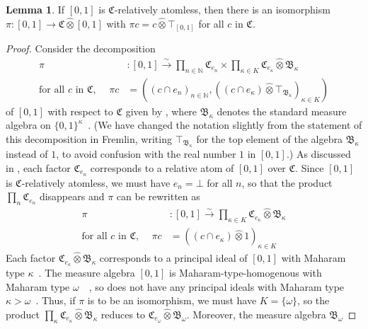 \documentclass[
  sigconf,
  screen, ]{acmart}
\theoremstyle{definition}
\newtheorem{lemma}[theorem]{Lemma}
\newcommand\N{\mathbb N}
\newcommand\frakB{\mathfrak B}
\newcommand\frakC{\mathfrak C}
\newcommand\fremlin[1]{\citet[#1]{fremlin2000measure}}
\newcommand\fremlinft[3]{\citet[\href{https://www1.essex.ac.uk/maths/people/fremlin/chap#2.pdf\#page=#3}{#1}]{fremlin2000measure}}
\newcommand\fremlinf[3]{\cite[\href{https://www1.essex.ac.uk/maths/people/fremlin/chap#2.pdf\#page=#3}{#1}]{fremlin2000measure}}
\newcommand\lmafp{\mathbin{\hat\otimes}}
\begin{document}
\begin{lemma} \label{app:lem:rel-atomless-projection}
  If $[0,1]$ is $\frakC$-relatively atomless,
  then there is an isomorphism $\pi : [0,1]\to \frakC\lmafp[0,1]$
  with $\pi c = c\lmafp \top_{[0,1]}$
  for all $c$ in $\frakC$.
\end{lemma}
\begin{proof}
  Consider the decomposition
   \begin{align*}
      \pi &: [0,1] \xrightarrow{\sim}\prod_{n\in\N} \frakC_{e_n} \times \prod_{\kappa\in K}\frakC_{e_\kappa}\lmafp \frakB_\kappa \\
      \text{for all $c$ in $\frakC$, }\quad\pi c &= ((c \cap e_n)_{n\in \N}, ((c\cap e_\kappa)\lmafp \top_{\frakB_\kappa})_{\kappa\in K})
   \end{align*}
   of $[0,1]$ with respect to $\frakC$
   given by
   \fremlin{\href{https://www1.essex.ac.uk/maths/people/fremlin/chap33.pdf\#page=29}{333K}},
  where $\frakB_\kappa$ denotes the standard
  measure algebra on $\{0,1\}^\kappa$~\fremlinf{333A(d)}{33}{22}.
  (We have changed the notation slightly
  from the statement of this decomposition in Fremlin, writing $\top_{\frakB_\kappa}$
  for the top element of the algebra $\frakB_\kappa$ instead of $1$,
  to avoid confusion with the real number $1$ in $[0,1]$.)
  As discussed in \fremlinft{333K(a)}{33}{29},
  each factor $\frakC_{e_n}$ corresponds to a relative atom of $[0,1]$ over $\frakC$.
  Since $[0,1]$ is $\frakC$-relatively atomless,
  we must have $e_n = \bot$ for all $n$,
  so that the product $\prod_n \frakC_{e_n}$ disappears and $\pi$ can be rewritten as
   \begin{align*}
      \pi &: [0,1] \xrightarrow{\sim} \prod_{\kappa\in K}\frakC_{e_\kappa}\lmafp \frakB_\kappa \\
      \text{for all $c$ in $\frakC$, }\quad\pi c &= ((c\cap e_\kappa)\lmafp 1)_{\kappa\in K}
   \end{align*}
  Each factor $\frakC_{e_\kappa}\lmafp\frakB_\kappa$
  corresponds to a principal ideal of $[0,1]$ with Maharam type $\kappa$~\fremlinf{333G(a)}{33}{25}.
   The measure algebra $[0,1]$ is Maharam-type-homogenous
   with Maharam type $\omega$~\fremlinf{331K}{33}{7}~\fremlinf{254K}{25}{53},
   so does not have any principal ideals
   with Maharam type $\kappa>\omega$~\fremlinf{331H(c)}{33}{5}.
  Thus, if $\pi$ is to be an isomorphism, we must have $K = \{\omega\}$, so
  the product $\prod_\kappa \frakC_{e_\kappa}\lmafp \frakB_\kappa$
  reduces to $\frakC_{e_\omega}\lmafp \frakB_\omega$.
  Moreover, the measure algebra $\frakB_\omega$

\end{proof}
\end{document}
